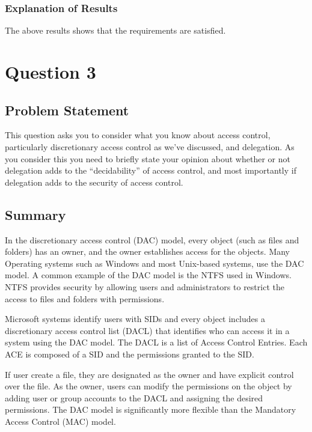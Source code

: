 \documentclass{report}
\begin{document}
\subsection{Explanation of Results}
\label{sec:explanation-results-2}
The above results shows that the requirements are satisfied.



 \chapter{Question 3}
 \label{cha:exercise-11.6.3}
  
 \section{Problem Statement}
 \label{sec:problem-statement-3}

This question asks you to consider what you know about access control, particularly
discretionary access control as we’ve discussed, and delegation. As you consider this you
need to briefly state your opinion about whether or not delegation adds to the
“decidability” of access control, and most importantly if delegation adds to the security of
access control.

\section{Summary}
\label{sec:summary-3}

In the discretionary access control (DAC) model, every object (such as
files and folders) has an owner, and the owner establishes access for
the objects.  Many Operating systems such as Windows and most
Unix-based systems, use the DAC model.  A common example of the DAC
model is the NTFS used in Windows.  NTFS provides security by allowing
users and administrators to restrict the access to files and folders
with permissions.

Microsoft systems identify users with SIDs and every object includes a 
discretionary access control list (DACL) that identifies who can access it in 
a system using the DAC model. The DACL is a list of Access Control Entries. 
Each ACE is composed of a SID and the permissions granted to the SID.

If user create a file, they are designated as the owner and have
explicit control over the file. As the owner, users can modify the
permissions on the object by adding user or group accounts to the DACL
and assigning the desired permissions. The DAC model is significantly
more flexible than the Mandatory Access Control (MAC) model.
\end{document}

